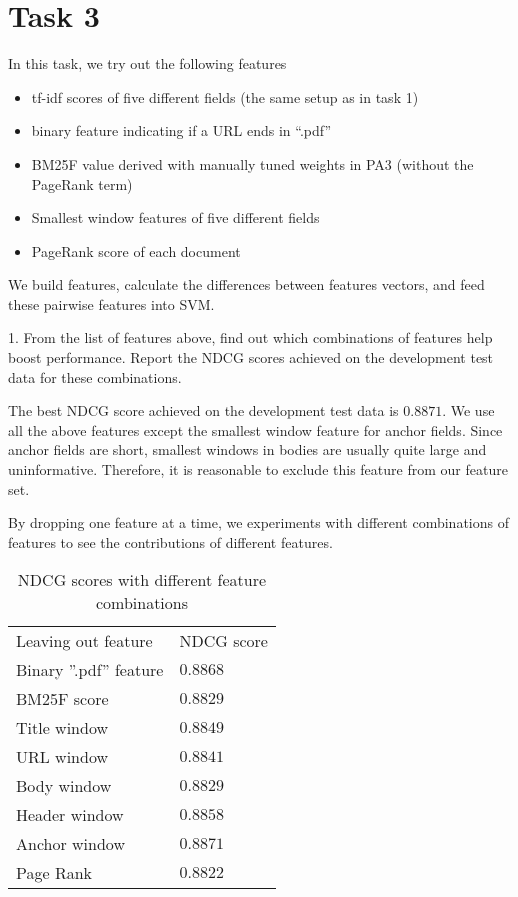 \section{Task 3}
In this task, we try out the following features
\begin{itemize}
  \item[] tf-idf scores of five different fields (the same setup as in task 1)
  \item[] binary feature indicating if a URL ends in ``.pdf''
  \item[] BM25F value derived with manually tuned weights in PA3 (without the PageRank term)
  \item[] Smallest window features of five different fields
  \item[] PageRank score of each document
\end{itemize}
We build features, calculate the differences between features vectors, and feed these pairwise features into SVM.

1. From the list of features above, find out which combinations of features help boost
performance. Report the NDCG scores achieved on the development test data
for these combinations.

The best NDCG score achieved on the development test data is $0.8871$.
We use all the above features except the smallest window feature for anchor fields.
Since anchor fields are short, smallest windows in bodies are usually quite large and uninformative. Therefore, it is reasonable to exclude this feature from our feature set.

By dropping one feature at a time, we experiments with different combinations of features to see the contributions of different features.
\begin{table}
\begin{center}
\begin{tabular}{|l|l|}
  \hline
  Leaving out feature & NDCG score \\
  Binary ''.pdf'' feature & $0.8868$ \\
  BM25F score & $0.8829$ \\
  Title window & $0.8849$ \\
  URL window & $0.8841$ \\
  Body window & $0.8829$ \\
  Header window & $0.8858$ \\
  Anchor window & $\mathbf{0.8871}$ \\
  Page Rank & $0.8822$ \\
  \hline
\end{tabular}
\caption{NDCG scores with different feature combinations}\label{tab:perform}
\end{center}
\end{table}


